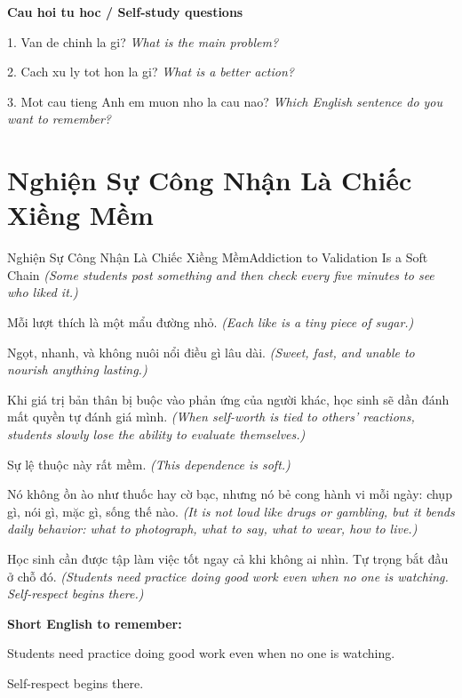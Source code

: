 \begin{tuhocnhanh}
\textbf{Cau hoi tu hoc / Self-study questions}

1. Van de chinh la gi? \textit{What is the main problem?}

2. Cach xu ly tot hon la gi? \textit{What is a better action?}

3. Mot cau tieng Anh em muon nho la cau nao? \textit{Which English sentence do you want to remember?}
\end{tuhocnhanh}
\ngancach

\section{Nghiện Sự Công Nhận Là Chiếc Xiềng Mềm}
\begin{truyen}{Nghiện Sự Công Nhận Là Chiếc Xiềng Mềm}{Addiction to Validation Is a Soft Chain}
\textit{(Some students post something and then check every five minutes to see who liked it.)}

Mỗi lượt thích là một mẩu đường nhỏ.
\textit{(Each like is a tiny piece of sugar.)}

Ngọt, nhanh, và không nuôi nổi điều gì lâu dài.
\textit{(Sweet, fast, and unable to nourish anything lasting.)}

Khi giá trị bản thân bị buộc vào phản ứng của người khác, học sinh sẽ dần đánh mất quyền tự đánh giá mình.
\textit{(When self-worth is tied to others’ reactions, students slowly lose the ability to evaluate themselves.)}

Sự lệ thuộc này rất mềm.
\textit{(This dependence is soft.)}

Nó không ồn ào như thuốc hay cờ bạc, nhưng nó bẻ cong hành vi mỗi ngày: chụp gì, nói gì, mặc gì, sống thế nào.
\textit{(It is not loud like drugs or gambling, but it bends daily behavior: what to photograph, what to say, what to wear, how to live.)}

\end{truyen}

\begin{baihoc}
Học sinh cần được tập làm việc tốt ngay cả khi không ai nhìn. Tự trọng bắt đầu ở chỗ đó.
\textit{(Students need practice doing good work even when no one is watching. Self-respect begins there.)}
\end{baihoc}

\begin{ghinhoanh}
\textbf{Short English to remember:}

Students need practice doing good work even when no one is watching.

Self-respect begins there.

\end{ghinhoanh}

